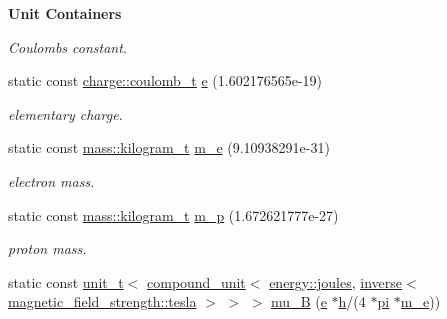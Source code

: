 \begin{Indent}{\bf Unit Containers}
\begin{DoxyCompactItemize}
\begin{DoxyCompactList}\small\item\em Coulomb\textquotesingle{}s constant. \end{DoxyCompactList}\item 
\hypertarget{namespaceunits_1_1constants_a4f73db4da457461d6251acdbfe0628b6}{}static const \hyperlink{classunits_1_1unit__t}{charge\+::coulomb\+\_\+t} \hyperlink{namespaceunits_1_1constants_a4f73db4da457461d6251acdbfe0628b6}{e} (1.\+602176565e-\/19)\label{namespaceunits_1_1constants_a4f73db4da457461d6251acdbfe0628b6}

\begin{DoxyCompactList}\small\item\em elementary charge. \end{DoxyCompactList}\item 
\hypertarget{namespaceunits_1_1constants_aca99eec57edd26b3a2e86e2ff1262b0b}{}static const \hyperlink{classunits_1_1unit__t}{mass\+::kilogram\+\_\+t} \hyperlink{namespaceunits_1_1constants_aca99eec57edd26b3a2e86e2ff1262b0b}{m\+\_\+e} (9.\+10938291e-\/31)\label{namespaceunits_1_1constants_aca99eec57edd26b3a2e86e2ff1262b0b}

\begin{DoxyCompactList}\small\item\em electron mass. \end{DoxyCompactList}\item 
\hypertarget{namespaceunits_1_1constants_a659c8046b36f043399d1cae5813ae163}{}static const \hyperlink{classunits_1_1unit__t}{mass\+::kilogram\+\_\+t} \hyperlink{namespaceunits_1_1constants_a659c8046b36f043399d1cae5813ae163}{m\+\_\+p} (1.\+672621777e-\/27)\label{namespaceunits_1_1constants_a659c8046b36f043399d1cae5813ae163}

\begin{DoxyCompactList}\small\item\em proton mass. \end{DoxyCompactList}\item 
\hypertarget{namespaceunits_1_1constants_af2b2c603a3c5e883f7fe100cfb1303ba}{}static const \hyperlink{classunits_1_1unit__t}{unit\+\_\+t}$<$ \hyperlink{group___unit_types_ga9c3f6f077dc894620e1ed8358442a8f1}{compound\+\_\+unit}$<$ \hyperlink{structunits_1_1unit}{energy\+::joules}, \hyperlink{group___unit_manipulators_gaacc539ef162e24b260d023d3ff949b57}{inverse}$<$ \hyperlink{structunits_1_1unit}{magnetic\+\_\+field\+\_\+strength\+::tesla} $>$ $>$ $>$ \hyperlink{namespaceunits_1_1constants_af2b2c603a3c5e883f7fe100cfb1303ba}{mu\+\_\+\+B} (\hyperlink{namespaceunits_1_1constants_a4f73db4da457461d6251acdbfe0628b6}{e} $\ast$\hyperlink{namespaceunits_1_1constants_a193cee77d3adc2eac3678f5c3f7ecf04}{h}/(4 $\ast$\hyperlink{namespaceunits_1_1constants_a2a49f99b6adbb852fb62b5584c902f78}{pi} $\ast$\hyperlink{namespaceunits_1_1constants_aca99eec57edd26b3a2e86e2ff1262b0b}{m\+\_\+e}))\label{namespaceunits_1_1constants_af2b2c603a3c5e883f7fe100cfb1303ba}


\end{DoxyCompactItemize}
\end{Indent}
